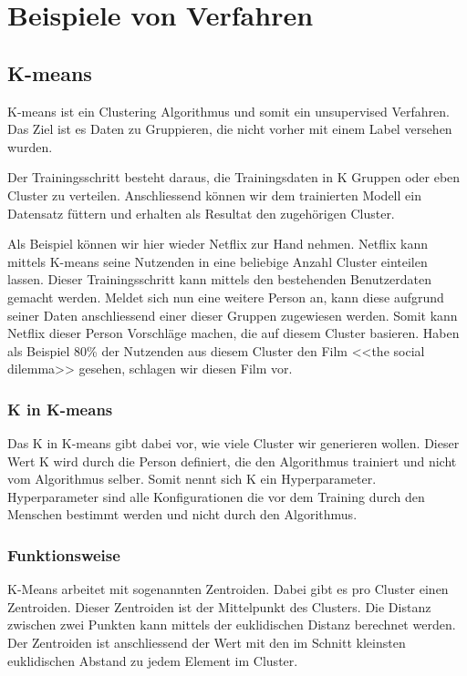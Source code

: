 \chapter{Beispiele von Verfahren}

\section{K-means}
K-means ist ein Clustering Algorithmus und somit ein unsupervised Verfahren. Das Ziel ist es Daten zu Gruppieren, die nicht vorher mit einem Label versehen wurden.

Der Trainingsschritt besteht daraus, die Trainingsdaten in K Gruppen oder eben Cluster zu verteilen. Anschliessend können wir dem trainierten Modell ein Datensatz füttern und erhalten als Resultat den zugehörigen Cluster.

Als Beispiel können wir hier wieder Netflix zur Hand nehmen. Netflix kann mittels K-means seine Nutzenden in eine beliebige Anzahl Cluster einteilen lassen. Dieser Trainingsschritt kann mittels den bestehenden Benutzerdaten gemacht werden. Meldet sich nun eine weitere Person an, kann diese aufgrund seiner Daten anschliessend einer dieser Gruppen zugewiesen werden. Somit kann Netflix dieser Person Vorschläge machen, die auf diesem Cluster basieren. Haben als Beispiel 80\% der Nutzenden aus diesem Cluster den Film <<the social dilemma>> gesehen, schlagen wir diesen Film vor.

\subsection{K in K-means}
Das K in K-means gibt dabei vor, wie viele Cluster wir generieren wollen. Dieser Wert K wird durch die Person definiert, die den Algorithmus trainiert und nicht vom Algorithmus selber. Somit nennt sich K ein Hyperparameter. Hyperparameter sind alle Konfigurationen die vor dem Training durch den Menschen bestimmt werden und nicht durch den Algorithmus.

\subsection{Funktionsweise}
K-Means arbeitet mit sogenannten Zentroiden. Dabei gibt es pro Cluster einen Zentroiden. Dieser Zentroiden ist der Mittelpunkt des Clusters. Die Distanz zwischen zwei Punkten kann mittels der euklidischen Distanz berechnet werden.
Der Zentroiden ist anschliessend der Wert mit den im Schnitt kleinsten euklidischen Abstand zu jedem Element im Cluster.

